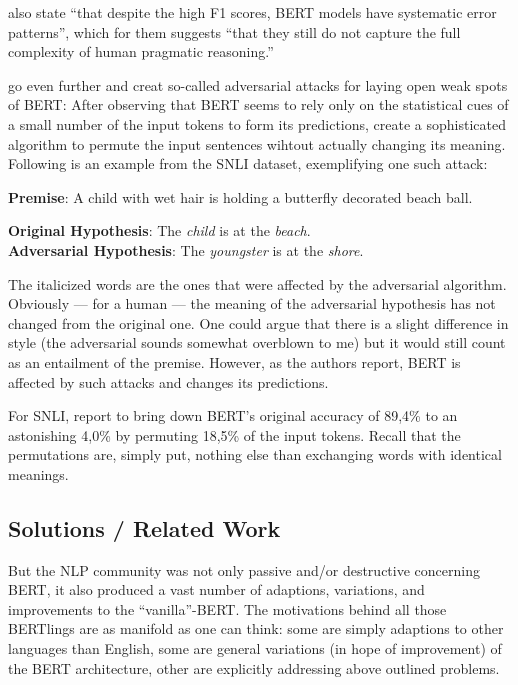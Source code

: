 \cite{jiang2019evaluating} also state ``that despite the high F1 scores, BERT models have
systematic error patterns'', which for them suggests ``that they still do not capture the
full complexity of human pragmatic reasoning.''

\cite{jin2020bert} go even further and creat so-called adversarial attacks for laying open
weak spots of BERT: After observing that BERT seems to rely only on the statistical cues of a
small number of the input tokens to form its predictions, \citeauthor{jin2020bert} create a
sophisticated algorithm to permute the input sentences wihtout actually changing its meaning.
Following is an example from the SNLI \citep{bowman2015snli} dataset, exemplifying one such
attack:

\begin{examples}
  \item \textbf{Premise}: A child with wet hair is holding a butterfly decorated beach ball.

        \textbf{Original Hypothesis}: The \emph{child} is at the \emph{beach}.\\
        \textbf{Adversarial Hypothesis}: The \emph{youngster} is at the \emph{shore}.
\end{examples}

The italicized words are the ones that were affected by the adversarial algorithm.
Obviously --- for a human --- the meaning of the adversarial hypothesis has not
changed from the original one. One could argue that there is a slight difference
in style (the adversarial sounds somewhat overblown to me) but it would still count
as an entailment of the premise. However, as the authors report, BERT is affected
by such attacks and changes its predictions.

For SNLI, \citeauthor{jin2020bert} report to bring down BERT's original accuracy of
89,4\% to an astonishing 4,0\% by permuting 18,5\% of the input tokens. Recall that
the permutations are, simply put, nothing else than exchanging words with identical meanings.




\subsection{Solutions / Related Work}

But the NLP community was not only passive and/or destructive concerning BERT, it also
produced a vast number of adaptions, variations, and improvements to the ``vanilla''-BERT.
The motivations behind all those BERTlings are as manifold as one can think: some are simply
adaptions to other languages than English, some are general variations (in hope of improvement)
of the BERT architecture, other are explicitly addressing above outlined problems.

